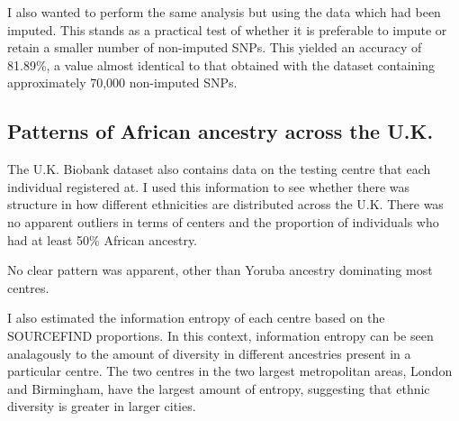 I also wanted to perform the same analysis but using the data which had been imputed. This stands as a practical test of whether it is preferable to impute or retain a smaller number of non-imputed SNPs. This yielded an accuracy of 81.89\%, a value almost identical to that obtained with the dataset containing approximately 70,000 non-imputed SNPs. 


\subsection{Patterns of African ancestry across the U.K.}

The U.K. Biobank dataset also contains data on the testing centre that each individual registered at. I used this information to see whether there was structure in how different ethnicities are distributed across the U.K. There was no apparent outliers in terms of centers and the proportion of individuals who had at least 50\% African ancestry.

No clear pattern was apparent, other than Yoruba ancestry dominating most centres. 
 
I also estimated the information entropy of each centre based on the SOURCEFIND proportions. In this context, information entropy can be seen analagously to the amount of diversity in different ancestries present in a particular centre. The two centres in the two largest metropolitan areas, London and Birmingham, have the largest amount of entropy, suggesting that ethnic diversity is greater in larger cities.

